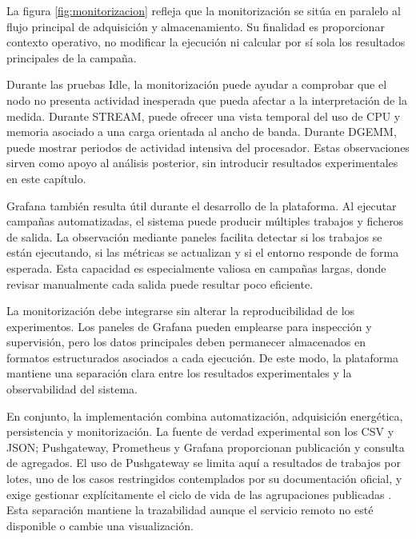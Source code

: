 La figura \ref{fig:monitorizacion} refleja que la monitorización se sitúa en paralelo al flujo principal de adquisición y almacenamiento. Su finalidad es proporcionar contexto operativo, no modificar la ejecución ni calcular por sí sola los resultados principales de la campaña.

Durante las pruebas Idle, la monitorización puede ayudar a comprobar que el nodo no presenta actividad inesperada que pueda afectar a la interpretación de la medida. Durante STREAM, puede ofrecer una vista temporal del uso de CPU y memoria asociado a una carga orientada al ancho de banda. Durante DGEMM, puede mostrar periodos de actividad intensiva del procesador. Estas observaciones sirven como apoyo al análisis posterior, sin introducir resultados experimentales en este capítulo.

Grafana también resulta útil durante el desarrollo de la plataforma. Al ejecutar campañas automatizadas, el sistema puede producir múltiples trabajos y ficheros de salida. La observación mediante paneles facilita detectar si los trabajos se están ejecutando, si las métricas se actualizan y si el entorno responde de forma esperada. Esta capacidad es especialmente valiosa en campañas largas, donde revisar manualmente cada salida puede resultar poco eficiente.

La monitorización debe integrarse sin alterar la reproducibilidad de los experimentos. Los paneles de Grafana pueden emplearse para inspección y supervisión, pero los datos principales deben permanecer almacenados en formatos estructurados asociados a cada ejecución. De este modo, la plataforma mantiene una separación clara entre los resultados experimentales y la observabilidad del sistema.

En conjunto, la implementación combina automatización, adquisición energética, persistencia y monitorización. La fuente de verdad experimental son los CSV y JSON; Pushgateway, Prometheus y Grafana proporcionan publicación y consulta de agregados. El uso de Pushgateway se limita aquí a resultados de trabajos por lotes, uno de los casos restringidos contemplados por su documentación oficial, y exige gestionar explícitamente el ciclo de vida de las agrupaciones publicadas \parencite{prometheusPushgateway}. Esta separación mantiene la trazabilidad aunque el servicio remoto no esté disponible o cambie una visualización.


